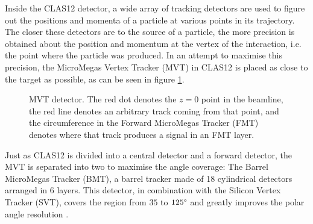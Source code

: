     Inside the CLAS12 detector, a wide array of tracking detectors are used to figure out the positions and momenta of a particle at various points in its trajectory.
    The closer these detectors are to the source of a particle, the more precision is obtained about the position and momentum at the vertex of the interaction, i.e. the point where the particle was produced.
    In an attempt to maximise this precision, the MicroMegas Vertex Tracker (MVT) in CLAS12 is placed as close to the target as possible, as can be seen in figure \ref{fig::mvt}.

    \begin{figure}[b!]
        \centering{}
        \caption[MVT detector.]{MVT detector. The red dot denotes the $z=0$ point in the beamline, the red line denotes an arbitrary track coming from that point, and the circumference in the Forward MicroMegas Tracker (FMT) denotes where that track produces a signal in an FMT layer.}
        \label{fig::mvt}
    \end{figure}

    Just as CLAS12 is divided into a central detector and a forward detector, the MVT is separated into two to maximise the angle coverage:
    The Barrel MicroMegas Tracker (BMT), a barrel tracker made of 18 cylindrical detectors arranged in 6 layers.
    This detector, in combination with the Silicon Vertex Tracker (SVT), covers the region from $35$ to $125\degree$ and greatly improves the polar angle resolution \cite{acker2020mvt}.

